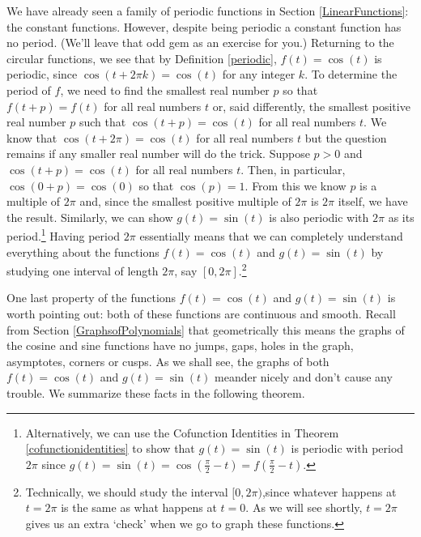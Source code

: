 We have already seen a family of periodic functions in Section \ref{LinearFunctions}:  the constant functions.  However, despite being periodic a constant function has no period.  (We'll leave that odd gem as an exercise for you.)  Returning to the circular functions, we see that by Definition \ref{periodic}, $f(t) = \cos(t)$ is periodic, since $\cos(t + 2\pi k) = \cos(t)$ for any integer $k$.  To determine the period of $f$, we need to find the smallest real number $p$ so that $f(t+p) = f(t)$ for all real numbers $t$ or, said differently, the smallest positive real number $p$ such that $\cos(t+p) = \cos(t)$  for all real numbers $t$.  We know that $\cos(t + 2\pi) = \cos(t)$ for all real numbers $t$ but the question remains if any smaller real number will do the trick.  Suppose $p>0$ and $\cos(t + p) = \cos(t)$ for all real numbers $t$.  Then, in particular, $\cos(0+p) = \cos(0)$ so that $\cos(p) = 1$.  From this we know $p$ is a multiple of $2\pi$ and, since the smallest positive multiple of $2\pi$ is $2\pi$ itself, we have the result.  Similarly, we can show $g(t) = \sin(t)$ is also periodic with $2\pi$ as its period.\footnote{Alternatively,  we can use the Cofunction Identities in Theorem \ref{cofunctionidentities} to show that $g(t) = \sin(t)$ is periodic with period $2\pi$ since $g(t) = \sin(t) = \cos\left(\frac{\pi}{2} - t\right) = f\left(\frac{\pi}{2} - t\right)$.}  Having period $2\pi$ essentially means that we can completely understand everything about the functions  $f(t) = \cos(t)$ and $g(t) = \sin(t)$ by studying one interval of length $2\pi$, say $[0,2\pi]$.\footnote{Technically, we should study the interval $[0,2\pi)$,\footnotemark since whatever happens at $t=2\pi$ is the same as what happens at $t=0$.  As we will see shortly, $t=2\pi$ gives us an extra `check' when we go to graph these functions.} \footnotetext{In some advanced texts, the interval of choice is $[-\pi, \pi)$.} 

\smallskip

One last property of the functions $f(t) = \cos(t)$ and $g(t) = \sin(t)$ is worth pointing out:   both of these functions are continuous and smooth.  Recall from Section \ref{GraphsofPolynomials} that geometrically this means the graphs of the cosine and sine functions have no jumps, gaps, holes in the graph,  asymptotes, corners or cusps.  As we shall see, the graphs of both $f(t) = \cos(t)$ and $g(t) = \sin(t)$ meander nicely and don't cause any trouble.  We summarize these facts in the following theorem.


\smallskip

